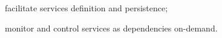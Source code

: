 \begin{description}
  \item facilitate services definition and persistence;
  \item monitor and control services as dependencies on-demand.
\end{description}